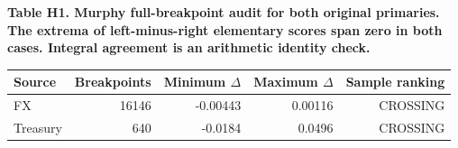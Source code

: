 \documentclass[10pt,a4paper]{article}
\begin{document}
\begin{center}
\begin{minipage}{\linewidth}
\small\textbf{Table H1. Murphy full-breakpoint audit for both original primaries. The extrema of left-minus-right elementary scores span zero in both cases. Integral agreement is an arithmetic identity check.}\par\medskip
\centering\fontsize{8}{10}\selectfont
\begin{tabular}{lrrrr}
\toprule
Source & Breakpoints & Minimum \(\Delta\) & Maximum \(\Delta\) & Sample ranking \\
\midrule
FX & 16146 & -0.00443 & 0.00116 & CROSSING \\
Treasury & 640 & -0.0184 & 0.0496 & CROSSING \\
\bottomrule
\end{tabular}
\end{minipage}
\end{center}
\end{document}
